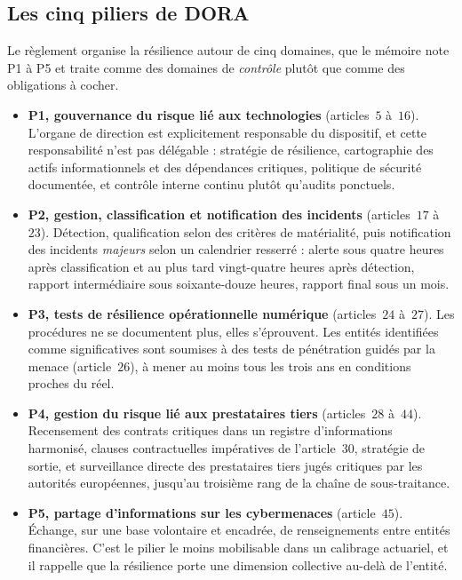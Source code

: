 \subsection{Les cinq piliers de DORA}
\label{subsec:cinq-piliers-dora}

Le règlement organise la résilience autour de cinq domaines, que le mémoire note P1 à P5 et
traite comme des domaines de \emph{contrôle} plutôt que comme des obligations à cocher.

\begin{itemize}[leftmargin=1.4em,itemsep=4pt]
\item \textbf{P1, gouvernance du risque lié aux technologies} (articles~$5$ à~$16$). L'organe de direction est
      explicitement responsable du dispositif, et cette responsabilité n'est pas délégable :
      stratégie de résilience, cartographie des actifs informationnels et des dépendances
      critiques, politique de sécurité documentée, et contrôle interne continu plutôt
      qu'audits ponctuels.
\item \textbf{P2, gestion, classification et notification des incidents} (articles~$17$ à~$23$). Détection,
      qualification selon des critères de matérialité, puis notification des incidents
      \emph{majeurs} selon un calendrier resserré : alerte sous quatre heures après
      classification et au plus tard vingt-quatre heures après détection, rapport
      intermédiaire sous soixante-douze heures, rapport final sous un mois.
\item \textbf{P3, tests de résilience opérationnelle numérique} (articles~$24$ à~$27$). Les procédures ne se
      documentent plus, elles s'éprouvent. Les entités identifiées comme significatives sont
      soumises à des tests de pénétration guidés par la menace (article~$26$), à mener au moins
      tous les trois ans en conditions proches du réel.
\item \textbf{P4, gestion du risque lié aux prestataires tiers} (articles~$28$ à~$44$). Recensement des contrats
      critiques dans un registre d'informations harmonisé, clauses contractuelles impératives
      de l'article~$30$,
      stratégie de sortie, et surveillance directe des prestataires tiers jugés critiques par
      les autorités européennes, jusqu'au troisième rang de la chaîne de sous-traitance.
\item \textbf{P5, partage d'informations sur les cybermenaces} (article~$45$). Échange, sur une base
      volontaire et encadrée, de renseignements entre entités financières. C'est le pilier le
      moins mobilisable dans un calibrage actuariel, et il rappelle que la résilience porte
      une dimension collective au-delà de l'entité.
\end{itemize}

